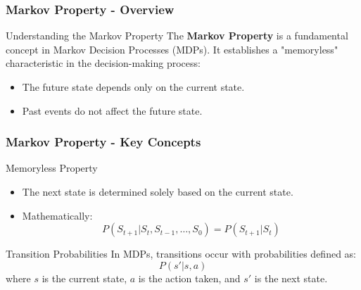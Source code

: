 \documentclass[aspectratio=169]{beamer}
\begin{document}
\begin{frame}[fragile]
    \frametitle{Markov Property - Overview}
    \begin{block}{Understanding the Markov Property}
        The \textbf{Markov Property} is a fundamental concept in Markov Decision Processes (MDPs). It establishes a "memoryless" characteristic in the decision-making process:
        \begin{itemize}
            \item The future state depends only on the current state.
            \item Past events do not affect the future state.
        \end{itemize}
    \end{block}
\end{frame}

\begin{frame}[fragile]
    \frametitle{Markov Property - Key Concepts}
    \begin{block}{Memoryless Property}
        \begin{itemize}
            \item The next state is determined solely based on the current state.
            \item Mathematically:
            \begin{equation}
                P(S_{t+1} | S_t, S_{t-1}, \ldots, S_0) = P(S_{t+1} | S_t)
            \end{equation}
        \end{itemize}
    \end{block}

    \begin{block}{Transition Probabilities}
        In MDPs, transitions occur with probabilities defined as:
        \begin{equation}
            P(s' | s, a)
        \end{equation}
        where \( s \) is the current state, \( a \) is the action taken, and \( s' \) is the next state.
    \end{block}
\end{frame}
\end{document}
